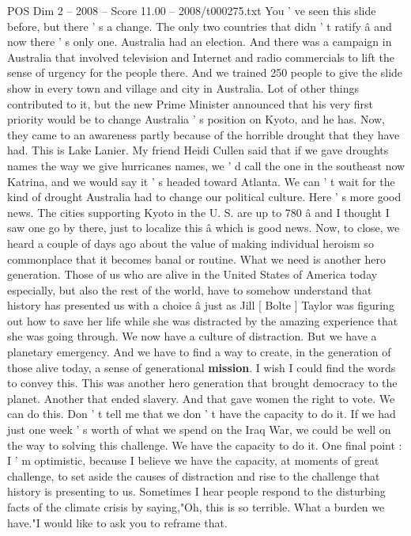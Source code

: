 \begin{textsample}{POS Dim 2 – 2008 – Score 11.00 – 2008/t000275.txt}
You ' ve seen this slide before, but there ' s a change.
The only two countries that didn ' t ratify â and now there ' s only one.
Australia had an election.
And there was a campaign in Australia that involved television and Internet and radio commercials to lift the sense of urgency for the people there.
And we trained 250 people to give the slide show in every town and village and city in Australia.
Lot of other things contributed to it, but the new Prime Minister announced that his very first priority would be to change Australia ' s position on Kyoto, and he has.
Now, they came to an awareness partly because of the horrible drought that they have had.
This is Lake Lanier.
My friend Heidi Cullen said that if we gave droughts names the way we give hurricanes names, we ' d call the one in the southeast now Katrina, and we would say it ' s headed toward Atlanta.
We can ' t wait for the kind of drought Australia had to change our political culture.
Here ' s more good news.
The cities supporting Kyoto in the U.
S. are up to 780 â and I thought I saw one go by there, just to localize this â which is good news.
Now, to close, we heard a couple of days ago about the value of making individual heroism so commonplace that it becomes banal or routine.
What we need is another hero generation.
Those of us who are alive in the United States of America today especially, but also the rest of the world, have to somehow understand that history has presented us with a choice â just as Jill [ Bolte ] Taylor was figuring out how to save her life while she was distracted by the amazing experience that she was going through.
We now have a culture of distraction.
But we have a planetary emergency.
And we have to find a way to create, in the generation of those alive today, a sense of generational \textbf{mission}.
I wish I could find the words to convey this.
This was another hero generation that brought democracy to the planet.
Another that ended slavery.
And that gave women the right to vote.
We can do this.
Don ' t tell me that we don ' t have the capacity to do it.
If we had just one week ' s worth of what we spend on the Iraq War, we could be well on the way to solving this challenge.
We have the capacity to do it.
One final point : I ' m optimistic, because I believe we have the capacity, at moments of great challenge, to set aside the causes of distraction and rise to the challenge that history is presenting to us.
Sometimes I hear people respond to the disturbing facts of the climate crisis by saying,"Oh, this is so terrible.
What a burden we have."I would like to ask you to reframe that.

\end{textsample}
